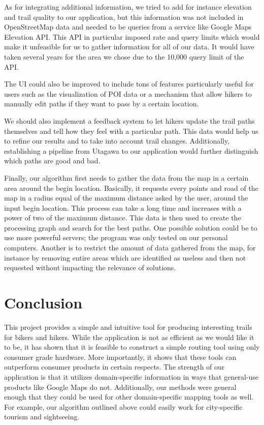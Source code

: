 \documentclass[sigconf]{acmart}
\begin{document}
As for integrating additional information, we tried to add for instance elevation and trail quality to our application, but this information was not included in OpenStreetMap data and needed to be queries from a service like Google Maps Elevation API. This API in particular imposed rate and query limits which would make it unfeasible for us to gather information for all of our data. It would have taken several years for the area we chose due to the 10,000 query limit of the API.

The UI could also be improved to include tons of features particularly useful for users such as the visualization of POI data or a mechanism that allow hikers to manually edit paths if they want to pass by a certain location.

We should also implement a feedback system to let hikers update the trail paths themselves and tell how they feel with a particular path. This data would help us to refine our results and to take into account trail changes. Additionally, establishing a pipeline from Utagawa to our application would further distinguish which paths are good and bad.

Finally, our algorithm first needs to gather the data from the map in a certain area around the begin location. Basically, it requests every points and road of the map in a radius equal of the maximum distance asked by the user, around the input begin location. This process can take a long time and increases with a power of two of the maximum distance. This data is then used to create the processing graph and search for the best paths. One possible solution could be to use more powerful servers; the program was only tested on our personal computers. Another is to restrict the amount of data gathered from the map, for instance by removing entire areas which are identified as useless and then not requested without impacting the relevance of solutions.

\section{Conclusion}
This project provides a simple and intuitive tool for producing interesting trails for bikers and hikers. While the application is not as efficient as we would like it to be, it has shown that it is feasible to construct a simple routing tool using only consumer grade hardware. More importantly, it shows that these tools can outperform consumer products in certain respects. The strength of our application is that it utilizes domain-specific information in ways that general-use products like Google Maps do not. Additionally, our methods were general enough that they could be used for other domain-specific mapping tools as well. For example, our algorithm outlined above could easily work for city-specific tourism and sightseeing. 
\end{document}
